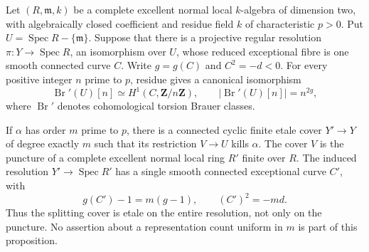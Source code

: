 \begin{proposition}
\label{D:single-curve-Brauer-residue-cover}
Let $(R,\mathfrak m,k)$ be a complete excellent normal local
$k$-algebra of dimension two, with algebraically closed
coefficient and residue field $k$ of characteristic $p>0$.
Put $U=\operatorname{Spec}R-\{\mathfrak m\}$.  Suppose that
there is a projective regular resolution
$\pi:Y\to\operatorname{Spec}R$, an isomorphism over $U$,
whose reduced exceptional fibre is one smooth connected
curve $C$.  Write $g=g(C)$ and $C^2=-d<0$.
For every positive integer $n$ prime to $p$, residue gives
a canonical isomorphism
\[
       \operatorname{Br}'(U)[n]
          \simeq H^1(C,\mathbf Z/n\mathbf Z),
       \qquad |\operatorname{Br}'(U)[n]|=n^{2g},       \tag{D.RC.1}
\]
where $\operatorname{Br}'$ denotes cohomological torsion
Brauer classes.

If $\alpha$ has order $m$ prime to $p$, there is a connected
cyclic finite etale cover $Y'\to Y$ of degree exactly $m$
such that its restriction $V\to U$ kills $\alpha$.
The cover $V$ is the puncture of a complete excellent normal
local ring $R'$ finite over $R$.  The induced resolution
$Y'\to\operatorname{Spec}R'$ has a single smooth connected
exceptional curve $C'$, with
\[
          g(C')-1=m(g-1),\qquad (C')^2=-md.          \tag{D.RC.2}
\]
Thus the splitting cover is etale on the entire resolution,
not only on the puncture.  No assertion about a representation
count uniform in $m$ is part of this proposition.
\end{proposition}

